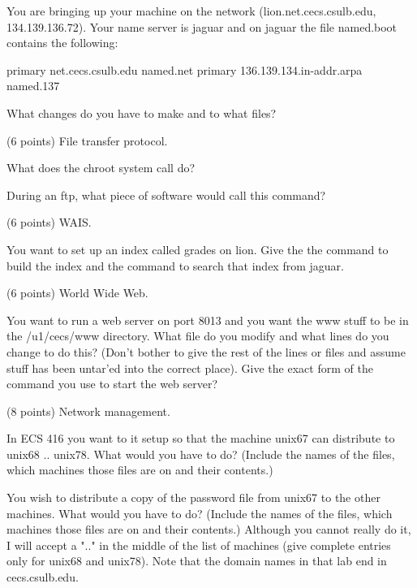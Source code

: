 You are bringing up your machine on the network
({\ltt{}lion.net.cecs.csulb.edu}, {\ltt{}134.139.136.72}).
Your name server is jaguar and on jaguar the file {\ltt{}named.boot}
contains the following:

{\program
primary  net.cecs.csulb.edu        named.net
primary  136.139.134.in-addr.arpa  named.137
\endprogram}

What changes do you have to make and to what files?
\vskip 2in

\ques
(6 points)
File transfer protocol.

What does the {\ltt{}chroot} system call do?
\vskip 1in

During an ftp, what piece of software would call this command?
\vskip 1in

\ques
(6 points)
WAIS.

You want to set up an index called {\ltt{}grades} on {\ltt{}lion}.
Give the the command to build the index and
the command to search that index from {\ltt{}jaguar}.
\vskip 1in

\ques
(6 points)
World Wide Web.

You want to run a web server on port 8013 and you want the www stuff
to be in the {\ltt{}/u1/cecs/www} directory.
What file do you modify and what lines do you change to do this?
(Don't bother to give the rest of the lines or files and assume
stuff has been untar'ed into the correct place).
\vskip 1in
Give the exact form of the command you use to start the web server?
\vskip 1in

\ques
(8 points)
Network management.

In ECS 416 you want to it setup so that the machine {\ltt{}unix67}
can distribute to {\ltt{}unix68} .. {\ltt{}unix78}.
What would you have to do?
(Include the names of the files, which machines those files are
on and their contents.)
\vskip 1.2in

You wish to distribute a copy of the password file from {\ltt{}unix67}
to the other machines.
What would you have to do?
(Include the names of the files, which machines those files are
on and their contents.)
Although you cannot really do it, I will accept a ".." in the
middle of the list of machines (give complete entries only for unix68 and 
unix78).
Note that the domain names in that lab end in {\ltt{}cecs.csulb.edu}.
\vskip 1in
\bye
